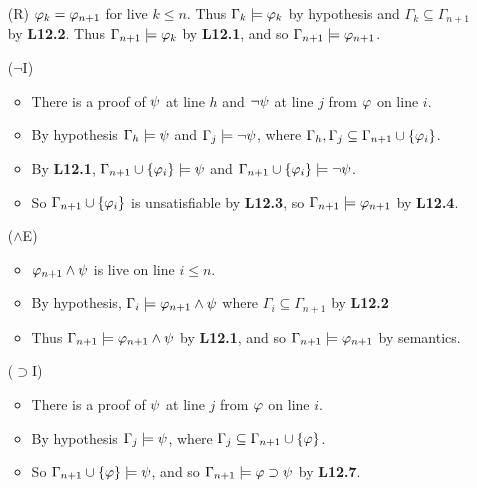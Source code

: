 \documentclass[a4paper, 11pt]{article} %
\begin{document}
\begin{enumerate}[labelsep=.1in]
  \item[(R)] $\varphi_k=\varphi_{n+1}$ for live $k\leq n$. Thus $\Gamma_k\models\varphi_k$ by hypothesis and $\Gamma_k\subseteq\Gamma_{n+1}$ by \textbf{L12.2}. Thus $\Gamma_{n+1}\models\varphi_k$ by \textbf{L12.1}, and so $\Gamma_{n+1}\models\varphi_{n+1}$.
  \item[($\neg$I)] %
    \begin{itemize}
      \item There is a proof of $\psi$ at line $h$ and $\neg\psi$ at line $j$ from $\varphi$ on line $i$. 
      \item By hypothesis $\Gamma_h\models \psi$ and $\Gamma_j\models\neg\psi$, where $\Gamma_h,\Gamma_j\subseteq\Gamma_{n+1}\cup\lbrace\varphi_i\rbrace$.
      \item By \textbf{L12.1}, $\Gamma_{n+1}\cup\lbrace\varphi_i\rbrace\models\psi$ and $\Gamma_{n+1}\cup\lbrace\varphi_i\rbrace\models\neg\psi$.
      \item So $\Gamma_{n+1}\cup\lbrace\varphi_i\rbrace$ is unsatisfiable by \textbf{L12.3}, so $\Gamma_{n+1}\models\varphi_{n+1}$ by \textbf{L12.4}.
    \end{itemize}
  \item[($\wedge$E)]
    \begin{itemize}
      \item $\varphi_{n+1}\wedge\psi$ is live on line $i\leq n$.
      \item By hypothesis, $\Gamma_i\models\varphi_{n+1}\wedge\psi$ where $\Gamma_i\subseteq\Gamma_{n+1}$ by \textbf{L12.2}
      \item Thus $\Gamma_{n+1}\models\varphi_{n+1}\wedge\psi$ by \textbf{L12.1}, and so $\Gamma_{n+1}\models\varphi_{n+1}$ by semantics.
    \end{itemize}
  \item[($\supset$I)]
    \begin{itemize}
      \item There is a proof of $\psi$ at line $j$ from $\varphi$ on line $i$. 
      \item By hypothesis $\Gamma_j\models \psi$, where $\Gamma_j\subseteq\Gamma_{n+1}\cup\lbrace\varphi\rbrace$.
      \item So $\Gamma_{n+1}\cup\lbrace\varphi\rbrace\models\psi$, and so $\Gamma_{n+1}\models\varphi\supset\psi$ by \textbf{L12.7}.
    \end{itemize}
\end{enumerate}
\end{document}
